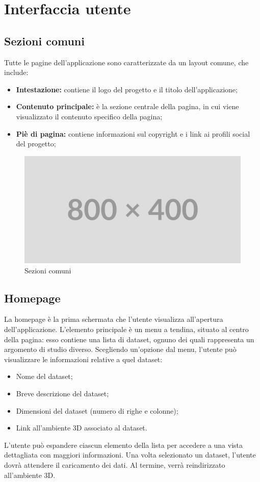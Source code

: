 \section{Interfaccia utente}
\subsection{Sezioni comuni}
Tutte le pagine dell'applicazione sono caratterizzate da un layout comune, che
include:
\begin{itemize}
    \item \textbf{Intestazione:} contiene il logo del progetto e il titolo dell'applicazione;
    \item \textbf{Contenuto principale:} è la sezione centrale della pagina, in cui viene visualizzato il contenuto specifico della pagina;
    \item \textbf{Piè di pagina:} contiene informazioni sul copyright e i link ai profili social del progetto;
\end{itemize}
\begin{figure}[ht!]
    \centering
    \includegraphics[scale=0.6]{template/images/placeholder.png}
    \caption{Sezioni comuni}
\end{figure}

\subsection{Homepage}
La homepage è la prima schermata che l'utente visualizza all'apertura
dell'applicazione. L'elemento principale è un menu a tendina, situato al centro
della pagina: esso contiene una lista di dataset, ognuno dei quali rappresenta
un argomento di studio diverso. Scegliendo un'opzione dal menu, l'utente può
visualizzare le informazioni relative a quel dataset:
\begin{itemize}
    \item Nome del dataset;
    \item Breve descrizione del dataset;
    \item Dimensioni del dataset (numero di righe e colonne);
    \item Link all'ambiente 3D associato al dataset.
\end{itemize}
L'utente può espandere ciascun elemento della
lista per accedere a una vista dettagliata con maggiori informazioni. Una volta
selezionato un dataset, l'utente dovrà attendere il caricamento dei dati. Al
termine, verrà reindirizzato all'ambiente 3D.

